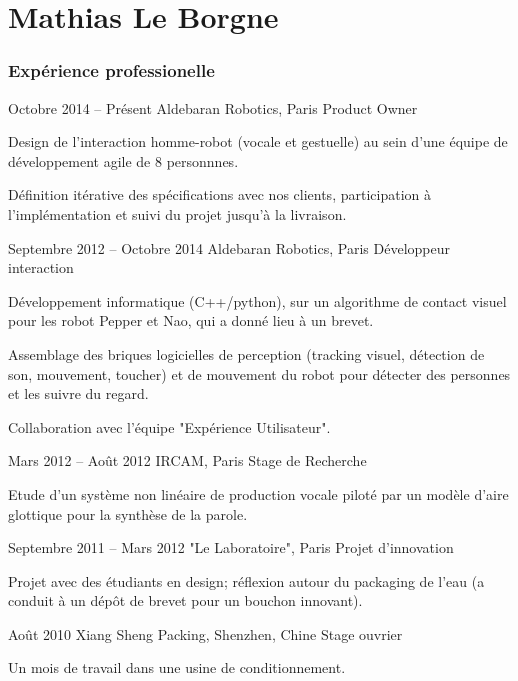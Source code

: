 \documentclass{tccv}
\begin{document}
\part{Mathias Le Borgne}

\section{Expérience professionelle}

\begin{eventlist}

\item{Octobre 2014 -- Présent}
     {Aldebaran Robotics, Paris}
     {Product Owner}

Design de l'interaction homme-robot (vocale et gestuelle)
au sein d'une équipe de développement agile de 8 personnnes.

Définition itérative des spécifications avec nos clients,
participation à l'implémentation
et suivi du projet jusqu'à la livraison.

\item{Septembre 2012 -- Octobre 2014}
     {Aldebaran Robotics, Paris}
     {Développeur interaction}

Développement informatique (C++/python),
sur un algorithme de contact visuel
pour les robot Pepper et Nao,
qui a donné lieu à un brevet.

Assemblage des briques logicielles de perception
(tracking visuel, détection de son, mouvement, toucher)
et de mouvement du robot
pour détecter des personnes et les suivre du regard.

Collaboration avec l'équipe "Expérience Utilisateur".

\item{Mars 2012 -- Août 2012}
     {IRCAM, Paris}
     {Stage de Recherche}

Etude d'un système non linéaire de production vocale piloté par un
modèle d’aire glottique pour la synthèse de la parole.


\item{Septembre 2011 -- Mars 2012}
    {"Le Laboratoire", Paris}
    {Projet d'innovation}

Projet avec des étudiants en design;
réflexion autour du packaging de l'eau (a conduit à un dépôt de brevet pour un bouchon innovant).

\item{Août 2010}
     {Xiang Sheng Packing, Shenzhen, Chine}
     {Stage ouvrier}

Un mois de travail dans une usine de conditionnement.

\end{eventlist}
\end{document}
